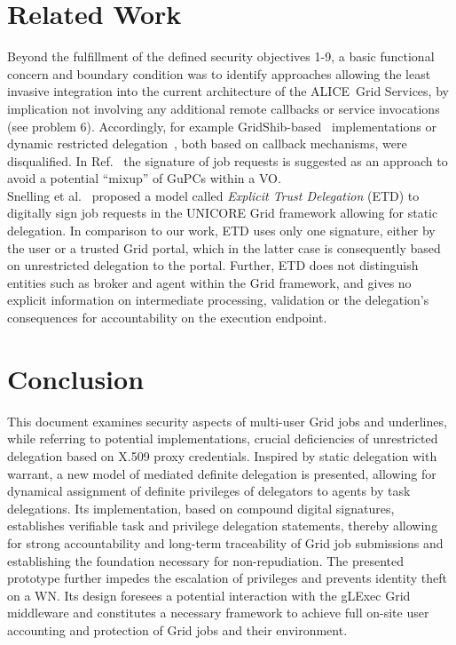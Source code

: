\documentclass[10pt]{iopart}
\newcommand{\alice}{ALICE}
\begin{document}
\section{Related Work}
\label{related}
Beyond the fulfillment of the defined
security objectives 1-9, a basic functional concern and boundary condition
was to identify approaches allowing the least invasive integration into the current architecture of the \alice\ Grid
Services, by implication not involving any additional remote callbacks or service
invocations (see problem 6). Accordingly, for example
GridShib-based~\cite{gridshib2} implementations
or dynamic restricted delegation~\cite{ondemanddeleg}, both based on callback mechanisms, were
disqualified. In Ref.~
the signature of job requests is suggested as an approach to avoid a
potential ``mixup'' of GuPCs within a VO.\\
Snelling et al.~\cite{etd} proposed a model called \textit{Explicit
Trust Delegation} (ETD) to digitally sign job requests in the UNICORE Grid framework
allowing for static delegation. In comparison to our work,
ETD uses only one signature, either by the user or a trusted Grid portal, which
in the latter case is consequently based on unrestricted delegation to the
portal. Further, ETD does not distinguish entities such as broker and agent
within the Grid framework, and gives no explicit information on intermediate
processing, validation or the delegation's consequences for accountability
on the execution endpoint. 

\section{Conclusion}
This document examines security aspects of multi-user Grid jobs and
underlines, while referring to potential implementations, crucial 
deficiencies of unrestricted delegation based on X.509 proxy
credentials. Inspired by static delegation with warrant,
a new model of mediated definite delegation is presented,
allowing for dynamical assignment of
definite privileges of delegators to agents by task delegations.
Its implementation, based on compound digital signatures,
establishes verifiable task and privilege delegation statements,
thereby allowing for strong
accountability and long-term traceability of Grid job submissions and
establishing the foundation necessary for non-repudiation. The presented
prototype further impedes the escalation of privileges and prevents
identity theft on a WN. Its design foresees a potential interaction with
the gLExec Grid middleware and constitutes a necessary framework to
achieve full on-site user accounting and protection of Grid jobs and
their environment.
\end{document}
